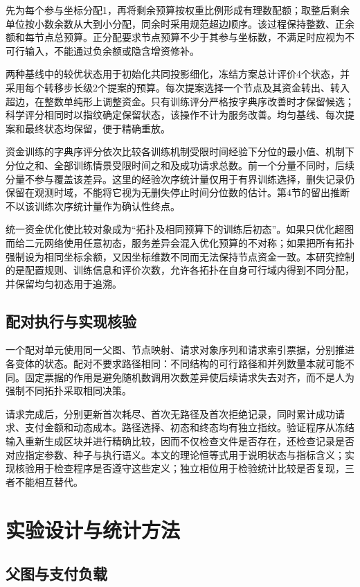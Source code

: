\documentclass[UTF8,a4paper,twocolumn,fontset=none,zihao=5]{ctexart}
\begin{document}
先为每个参与坐标分配1，再将剩余预算按权重比例形成有理数配额；取整后剩余单位按小数余数从大到小分配，同余时采用规范超边顺序。该过程保持整数、正余额和每节点总预算。正分配要求节点预算不少于其参与坐标数，不满足时应视为不可行输入，不能通过负余额或隐含增资修补。


两种基线中的较优状态用于初始化共同投影细化，冻结方案总计评价4个状态，并采用每个转移步长级2个提案的预算。每次提案选择一个节点及其资金转出、转入超边，在整数单纯形上调整资金。只有训练评分严格按字典序改善时才保留候选；科学评分相同时以指纹确定保留状态，该操作不计为服务改善。均匀基线、每次提案和最终状态均保留，便于精确重放。


资金训练的字典序评分依次比较各训练机制受限时间经验下分位的最小值、机制下分位之和、全部训练情景受限时间之和及成功请求总数。前一个分量不同时，后续分量不参与覆盖该差异。这里的经验次序统计量仅用于有界训练选择，删失记录仍保留在观测时域，不能将它视为无删失停止时间分位数的估计。第4节的留出推断不以该训练次序统计量作为确认性终点。


统一资金优化使比较对象成为“拓扑及相同预算下的训练后初态”。如果只优化超图而给二元网络使用任意初态，服务差异会混入优化预算的不对称；如果把所有拓扑强制设为相同坐标余额，又因坐标维数不同而无法保持节点资金一致。本研究控制的是配置规则、训练信息和评价次数，允许各拓扑在自身可行域内得到不同分配，并保留均匀初态用于追溯。


\subsection{配对执行与实现核验}

一个配对单元使用同一父图、节点映射、请求对象序列和请求索引票据，分别推进各变体的状态。配对不要求路径相同：不同结构的可行路径和并列数量本就可能不同。固定票据的作用是避免随机数调用次数差异使后续请求失去对齐，而不是人为强制不同拓扑采取相同决策。


请求完成后，分别更新首次耗尽、首次无路径及首次拒绝记录，同时累计成功请求、支付金额和动态成本。路径选择、初态和终态均有独立指纹。验证程序从冻结输入重新生成区块并进行精确比较，因而不仅检查文件是否存在，还检查记录是否对应指定参数、种子与执行语义。本文的理论恒等式用于说明状态与指标含义；实现核验用于检查程序是否遵守这些定义；独立相位用于检验统计比较是否复现，三者不能相互替代。


\section{实验设计与统计方法}

\subsection{父图与支付负载}
\end{document}
